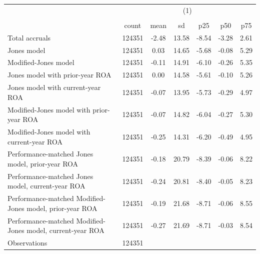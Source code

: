 {
\def\sym#1{\ifmmode^{#1}\else\(^{#1}\)\fi}
\begin{tabular}{l*{1}{cccccc}}
\hline\hline
                    &\multicolumn{6}{c}{(1)}                                                      \\
                    &\multicolumn{6}{c}{}                                                         \\
                    &       count&        mean&          sd&         p25&         p50&         p75\\
\hline
Total accruals      &      124351&       -2.48&       13.58&       -8.54&       -3.28&        2.61\\
Jones model         &      124351&        0.03&       14.65&       -5.68&       -0.08&        5.29\\
Modified-Jones model&      124351&       -0.11&       14.91&       -6.10&       -0.26&        5.35\\
Jones model with prior-year ROA&      124351&        0.00&       14.58&       -5.61&       -0.10&        5.26\\
Jones model with current-year ROA&      124351&       -0.07&       13.95&       -5.73&       -0.29&        4.97\\
Modified-Jones model with prior-year ROA&      124351&       -0.07&       14.82&       -6.04&       -0.27&        5.30\\
Modified-Jones model with current-year ROA&      124351&       -0.25&       14.31&       -6.20&       -0.49&        4.95\\
Performance-matched Jones model, prior-year ROA&      124351&       -0.18&       20.79&       -8.39&       -0.06&        8.22\\
Performance-matched Jones model, current-year ROA&      124351&       -0.24&       20.81&       -8.40&       -0.05&        8.23\\
Performance-matched Modified-Jones model, prior-year ROA&      124351&       -0.19&       21.68&       -8.71&       -0.06&        8.55\\
Performance-matched Modified-Jones model, current-year ROA&      124351&       -0.27&       21.69&       -8.71&       -0.03&        8.54\\
\hline
Observations        &      124351&            &            &            &            &            \\
\hline\hline
\end{tabular}
}
